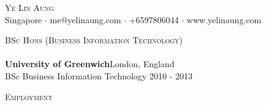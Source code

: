 \documentclass[a4paper]{article}
\newcommand{\lineunder} {
    \vspace*{-8pt} \\
    \hspace*{-18pt} \hrulefill \\
}
\newcommand{\header} [1] {
    {\hspace*{-18pt}\vspace*{6pt} \textsc{#1}}
    \vspace*{-6pt} \lineunder
}
\begin{document}
\vspace*{-40pt}

    

\vspace*{-10pt}
\begin{center}
	{\Huge \scshape {Ye Lin Aung}}\\
	Singapore $\cdot$ me@yelinaung.com $\cdot$ +6597806044 $\cdot$ www.yelinaung.com\\
\end{center}

\header{BSc Hons (Business Information Technology)}
\textbf{University of Greenwich}\hfill London, England\\
BSc Business Information Technology \hfill 2010 - 2013\\
\vspace{2mm}

\header{Employment}
\vspace{1mm}
\end{document}
